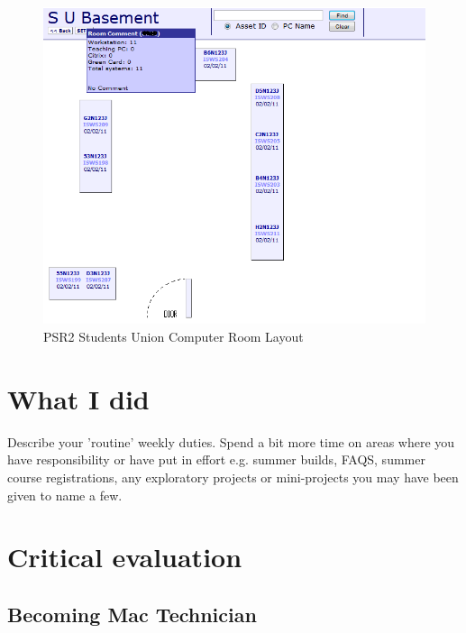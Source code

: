 \documentclass[10pt,a4paper,headinclude=true]{report}
\begin{document}
\begin{figure}[H]
\includegraphics[scale=0.5]{./PSR2_SU_Room_layout}
\caption{PSR2 Students Union Computer Room Layout}
\label{fig:PSR2_SU_Room_layout}
\end{figure}

\chapter{What I did}
Describe your 'routine' weekly duties. Spend a bit more time on areas where you have
responsibility or have put in effort e.g. summer builds, FAQS, summer course
registrations, any exploratory projects or mini-projects you may have been given to
name a few.

\chapter{Critical evaluation}
\section{Becoming Mac Technician}


\end{document}
